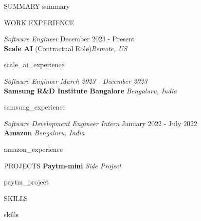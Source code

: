\documentclass{resume}
\begin{document}
\begin{rSection}{SUMMARY}
 \vspace{-2pt}
    {{ summary }}
\end{rSection}

\vspace{-5pt}
\begin{rSection}{WORK EXPERIENCE}

    \textit{Software Engineer} \hfill December 2023 - Present\\
    \textbf{Scale AI} (Contractual Role)\hfill \textit{Remote, US}
    \begin{itemize}
        \vspace{-1pt}
        \itemsep -3pt {}
        {{ scale_ai_experience }}
    \end{itemize}

    \textit{Software Engineer} \hfill \textit{March 2023 - December 2023} \\
    \textbf{Samsung R\&D Institute Bangalore} \hfill \textit{Bengaluru, India}
    \begin{itemize}
        \vspace{-1pt}
        \itemsep -3pt {}
        {{ samsung_experience }}
    \end{itemize}

    \textit{Software Development Engineer Intern} \hfill January 2022 - July 2022\\
    \textbf{Amazon} \hfill \textit{Bengaluru, India}
    \begin{itemize}
        \vspace{-1pt}
        \itemsep -3pt {}
        {{ amazon_experience }}
    \end{itemize}

\end{rSection}

\begin{rSection}{PROJECTS}
    \textbf{Paytm-mini} \hfill \textit{Side Project}
    \begin{itemize}
        \vspace{-1pt}
        \itemsep -3pt {}
        {{ paytm_project }}
    \end{itemize}
\end{rSection}

\begin{rSection}{SKILLS}
    \begin{itemize}
        \itemsep -3pt {}
        {{ skills }}
    \end{itemize}
\end{rSection}
\end{document}
